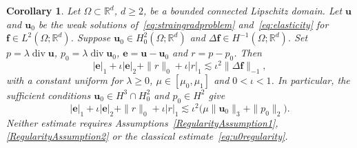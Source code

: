 \documentclass[10pt]{amsart}
\newtheorem{corollary}[theorem]{Corollary}
\renewcommand{\div}{\operatorname{div}}
\numberwithin{equation}{section}
\begin{document}
\begin{corollary}\label{cor:compatible-data}
Let $\Omega\subset\mathbb R^d$, $d\geq2$, be a bounded connected Lipschitz domain.
Let $\boldsymbol u$ and $\boldsymbol u_0$ be the weak solutions of~\eqref{eq:straingradproblem} and~\eqref{eq:elasticity} for $\boldsymbol f\in L^2(\Omega;\mathbb R^d)$. Suppose $\boldsymbol u_0\in H_0^2(\Omega;\mathbb R^d)$ and $\Delta\boldsymbol f\in H^{-1}(\Omega;\mathbb R^d)$. Set $p=\lambda\div\boldsymbol u$, $p_0=\lambda\div\boldsymbol u_0$, $\boldsymbol e=\boldsymbol u-\boldsymbol u_0$ and $r=p-p_0$. Then
\begin{equation}\label{eq:compatible-data}
|\boldsymbol e|_1+\iota|\boldsymbol e|_2+\|r\|_0+\iota|r|_1
\lesssim\iota^2\|\Delta\boldsymbol f\|_{-1},
\end{equation}
with a constant uniform for $\lambda\geq0$, $\mu\in[\mu_0,\mu_1]$ and $0<\iota<1$. In particular, the sufficient conditions $\boldsymbol u_0\in H^3\cap H_0^2$ and $p_0\in H^2$ give
\[
|\boldsymbol e|_1+\iota|\boldsymbol e|_2+\|r\|_0+\iota|r|_1
\lesssim\iota^2\big(\mu\|\boldsymbol u_0\|_3+\|p_0\|_2\big).
\]
Neither estimate requires Assumptions~\ref{RegularityAssumption1}, \ref{RegularityAssumption2} or the classical estimate~\eqref{eq:u0regularity}.
\end{corollary}
\end{document}
